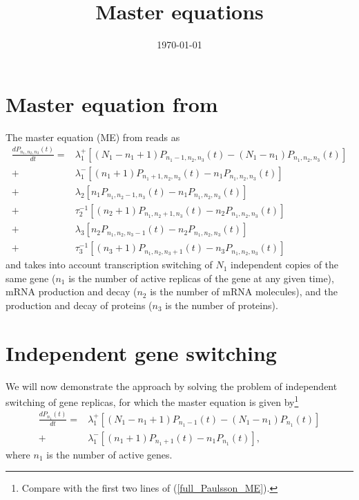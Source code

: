 \documentclass[a4paper, 11pt]{article}
\title{\textbf{Master equations}}
\date{\today}
\begin{document}
\maketitle

\begin{abstract}
\end{abstract}

\tableofcontents

\section{Master equation from \cite{PAULSSON2005157}}

The master equation (ME) from \cite{PAULSSON2005157} reads as
\begin{equation}
  \begin{split} \label{full_Paulsson_ME}
    \frac{dP_{n_1,n_2,n_3}(t)}{dt} = &\lambda_1^+\left[(N_1-n_1+1)P_{n_1-1,n_2,n_3}(t) - (N_1-n_1)P_{n_1,n_2,n_3}(t)\right]\\
    + & \lambda_1^-\left[(n_1+1)P_{n_1+1,n_2,n_3}(t) - n_1P_{n_1,n_2,n_3}(t)\right] \\
    + & \lambda_2\left[n_1P_{n_1,n_2-1,n_3}(t) - n_1P_{n_1,n_2,n_3}(t)\right]\\
    + & \tau_2^{-1}\left[(n_2+1)P_{n_1,n_2+1,n_3}(t) - n_2P_{n_1,n_2,n_3}(t)\right]\\
    + & \lambda_3\left[n_2P_{n_1,n_2,n_3-1}(t) - n_2P_{n_1,n_2,n_3}(t)\right]\\
    + & \tau_3^{-1}\left[(n_3+1)P_{n_1,n_2,n_3+1}(t) - n_3P_{n_1,n_2,n_3}(t)\right]
  \end{split}
\end{equation}
and takes into account transcription switching of $N_1$ independent copies of the same gene ($n_1$ is the number of active replicas of the gene at any given time), mRNA production and decay ($n_2$ is the number of mRNA molecules), and the production and decay of proteins ($n_3$ is the number of proteins).

\section{Independent gene switching} \label{sec::independent_gene_switching}

We will now demonstrate the approach by solving the problem of independent switching of gene replicas, for which the master equation is given by\footnote{Compare with the first two lines of (\ref{full_Paulsson_ME}).}
\begin{equation}
  \begin{split} \label{gene_switching_ME}
    \frac{dP_{n_1}(t)}{dt} = &\lambda_1^+\left[(N_1-n_1+1)P_{n_1-1}(t) - (N_1-n_1)P_{n_1}(t)\right]\\
    + & \lambda_1^-\left[(n_1+1)P_{n_1+1}(t) - n_1P_{n_1}(t)\right],
  \end{split}
\end{equation}
where $n_1$ is the number of active genes.
\end{document}
